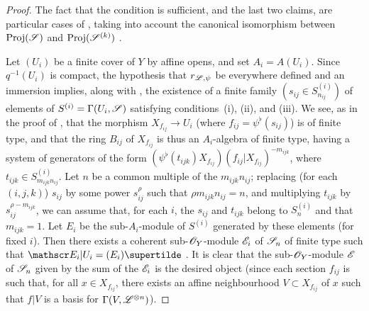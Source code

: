 \begin{proof}
The fact that the condition is sufficient, and the last two claims, are particular cases of , taking into account the canonical isomorphism between ${\mathop{\mathrm{Proj}}\nolimits}(\mathscr{S})$ and ${\mathop{\mathrm{Proj}}\nolimits}(\mathscr{S}^{(k)})$ .

Let $(U_i)$ be a finite cover of $Y$ by affine opens, and set $A_i=A(U_i)$.
Since $q^{-1}(U_i)$ is compact, the hypothesis that $r_{\mathscr{L},\psi}$ be everywhere defined and an immersion implies, along with , the existence of a finite family $(s_{ij}\in S_{n_{ij}}^{(i)})$ of elements of $S^{(i)}=\Gamma(U_i,\mathscr{S})$ satisfying conditions~(i), (ii), and (iii).
We see, as in the proof of , that the morphism $X_{f_{ij}}\to U_i$ (where $f_{ij}=\psi^\flat(s_{ij})$) is of finite type, and that the ring $B_{ij}$ of $X_{f_{ij}}$ is thus an $A_i$-algebra of finite type, having a system of generators of the form $(\psi^\flat(t_{ijk})X_{f_{ij}})(f_{ij}|X_{f_{ij}})^{-m_{ijk}}$, where $t_{ijk}\in S_{m_{ijk}n_{ij}}^{(i)}$.
Let $n$ be a common multiple of the $m_{ijk}n_{ij}$;
replacing (for each $(i,j,k)$) $s_{ij}$ by some power $s_{ij}^\rho$ such that $\rho m_{ijk}n_{ij}=n$, and multiplying $t_{ijk}$ by $s_{ij}^{\rho-m_{ijk}}$, we can assume that, for each $i$, the $s_{ij}$ and $t_{ijk}$ belong to $S_n^{(i)}$ and that $m_{ijk}=1$.
Let $E_i$ be the sub-$A_i$-module of $S^{(i)}$ generated by these elements (for fixed $i$).
Then there exists a coherent sub-$\mathscr{O}_Y$-module $\mathscr{E}_i$ of $\mathscr{S}_n$ of finite type such that $\sh{E}_i|U_i=(E_i)\supertilde$ .
It is clear that the sub-$\mathscr{O}_Y$-module $\mathscr{E}$ of $\mathscr{S}_n$ given by the sum of the $\mathscr{E}_i$ is the desired object (since each section $f_{ij}$ is such that, for all $x\in X_{f_{ij}}$, there exists an affine neighbourhood $V\subset X_{f_{ij}}$ of $x$ such that $f|V$ is a basis for $\Gamma(V,\mathscr{L}^{\otimes n})$).
\end{proof}
